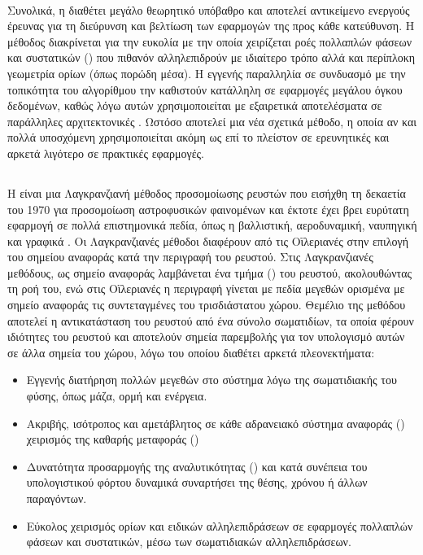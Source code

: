 \paragraph{} Συνολικά, η  διαθέτει μεγάλο θεωρητικό υπόβαθρο και αποτελεί
αντικείμενο ενεργούς έρευνας για τη διεύρυνση και βελτίωση των εφαρμογών της προς κάθε
κατεύθυνση. Η μέθοδος διακρίνεται για την ευκολία με την οποία χειρίζεται ροές πολλαπλών
φάσεων και συστατικών () που πιθανόν αλληλεπιδρούν με
ιδιαίτερο τρόπο αλλά και περίπλοκη γεωμετρία ορίων (όπως πορώδη μέσα). Η εγγενής
παραλληλία σε συνδυασμό με την τοπικότητα του αλγορίθμου την καθιστούν κατάλληλη σε
εφαρμογές μεγάλου όγκου δεδομένων, καθώς λόγω αυτών χρησιμοποιείται με εξαιρετικά
αποτελέσματα σε παράλληλες αρχιτεκτονικές . Ωστόσο αποτελεί μια νέα
σχετικά μέθοδο, η οποία αν και πολλά υποσχόμενη χρησιμοποιείται ακόμη ως επί το πλείστον
σε ερευνητικές και αρκετά λιγότερο σε πρακτικές εφαρμογές.

\subsection{\texorpdfstring{}{}}
\paragraph{} Η  είναι μια Λαγκρανζιανή μέθοδος προσομοίωσης ρευστών που εισήχθη
τη δεκαετία του 1970 για προσομοίωση αστροφυσικών φαινομένων \cite{gingold1977375,
  lucy19771013} και έκτοτε έχει βρει ευρύτατη εφαρμογή σε πολλά επιστημονικά πεδία, όπως η
βαλλιστική, αεροδυναμική, ναυπηγική και γραφικά \cite{monaghan20051703}. Οι Λαγκρανζιανές
μέθοδοι διαφέρουν από τις Οϊλεριανές στην επιλογή του σημείου αναφοράς κατά την περιγραφή
του ρευστού. Στις Λαγκρανζιανές μεθόδους, ως σημείο αναφοράς λαμβάνεται ένα τμήμα
() του ρευστού, ακολουθώντας τη ροή του, ενώ στις Οϊλεριανές η περιγραφή
γίνεται με πεδία μεγεθών ορισμένα με σημείο αναφοράς τις συντεταγμένες του τρισδιάστατου
χώρου. Θεμέλιο της μεθόδου αποτελεί η αντικατάσταση του ρευστού από ένα σύνολο σωματιδίων,
τα οποία φέρουν ιδιότητες του ρευστού και αποτελούν σημεία παρεμβολής για τον υπολογισμό
αυτών σε άλλα σημεία του χώρου, λόγω του οποίου διαθέτει αρκετά πλεονεκτήματα:
\begin{itemize}
\item Εγγενής διατήρηση πολλών μεγεθών στο σύστημα λόγω της σωματιδιακής του φύσης, όπως
  μάζα, ορμή και ενέργεια.
\item Ακριβής, ισότροπος και αμετάβλητος σε κάθε αδρανειακό σύστημα αναφοράς
  () χειρισμός της καθαρής μεταφοράς ()
\item Δυνατότητα προσαρμογής της αναλυτικότητας () και κατά συνέπεια του
  υπολογιστικού φόρτου δυναμικά συναρτήσει της θέσης, χρόνου ή άλλων παραγόντων.
\item Εύκολος χειρισμός ορίων και ειδικών αλληλεπιδράσεων σε εφαρμογές πολλαπλών φάσεων
  και συστατικών, μέσω των σωματιδιακών αλληλεπιδράσεων.
\end{itemize}

